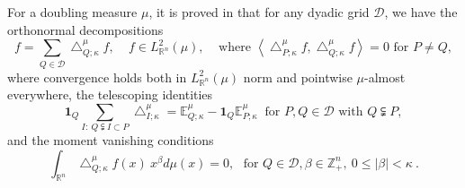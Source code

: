 \documentclass{amsart}%
\theoremstyle{plain}
\numberwithin{equation}{section}
\begin{document}
For a doubling measure $\mu$, it is proved in \cite{RaSaWi} that for any dyadic grid $\mathcal{D}$, we have the
orthonormal decompositions%
\begin{equation}
f=\sum_{Q\in\mathcal{D}}\bigtriangleup_{Q;\kappa}^{\mu}f,\ \ \ \ \ f\in
L_{\mathbb{R}^{n}}^{2}\left(  \mu\right)  ,\ \ \ \ \ \text{where }\left\langle
\bigtriangleup_{P;\kappa}^{\mu}f,\bigtriangleup_{Q;\kappa}^{\mu}f\right\rangle
=0\text{ for }P\neq Q, \label{Alpert expan}%
\end{equation}
where convergence holds both in $L_{\mathbb{R}^{n}}^{2}\left(  \mu\right)  $
norm and pointwise $\mu$-almost everywhere, the telescoping identities%
\begin{equation}
\mathbf{1}_{Q}\sum_{I:\ Q\subsetneqq I\subset P}\bigtriangleup_{I;\kappa}%
^{\mu}=\mathbb{E}_{Q;\kappa}^{\mu}-\mathbf{1}_{Q}\mathbb{E}_{P;\kappa}^{\mu
}\ \text{ \ for }P,Q\in\mathcal{D}\text{ with }Q\subsetneqq P,
\label{telescoping}%
\end{equation}
and the moment vanishing conditions%
\begin{equation}
\int_{\mathbb{R}^{n}}\bigtriangleup_{Q;\kappa}^{\mu}f\left(  x\right)
\ x^{\beta}d\mu\left(  x\right)  =0,\ \ \ \text{for }Q\in\mathcal{D},\text{
}\beta\in\mathbb{Z}_{+}^{n},\ 0\leq\left\vert \beta\right\vert <\kappa\ .
\label{mom con}%
\end{equation}
\end{document}
